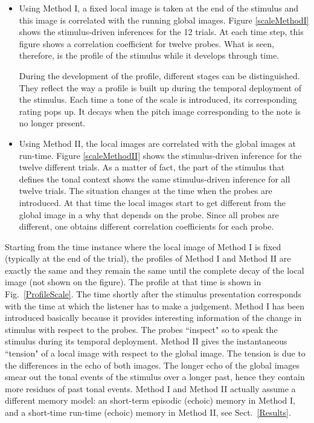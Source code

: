 \begin{itemize}
\item
    Using Method I, a fixed local image is taken at the end of the stimulus and this image
    is correlated with the running global images. Figure \ref{scaleMethodI} shows the
    stimulus-driven inferences for the 12 trials. At each time step, this figure shows a
    correlation coefficient for twelve probes. What is seen, therefore, is the profile of
    the stimulus while it develops through time.

    During the development of the profile, different stages can be distinguished. They
    reflect the way a profile is built up during the temporal deployment of the stimulus.
    Each time a tone of the scale is introduced, its corresponding rating pops up. It
    decays when the pitch image corresponding to the note is no longer present.

\item
    Using Method II, the local images are correlated with the global images at run-time.
    Figure \ref{scaleMethodII} shows the stimulus-driven inference for the twelve
    different trials. As a matter of fact, the part of the stimulus that defines the tonal
    context shows the same stimulus-driven inference for all twelve trials. The situation
    changes at the time when the probes are introduced. At that time the local images
    start to get different from the global image in a why that depends on the probe. Since
    all probes are different, one obtains different correlation coefficients for each
    probe.
\end{itemize}

Starting from the time instance where the local image of Method I is fixed (typically
at the end of the trial), the profiles of Method I and Method II are exactly the same
and they remain the same until the complete decay of the local image (not shown on the
figure). The profile at that time is shown in Fig.~\ref{ProfileScale}. The time
shortly after the stimulus presentation corresponds with the time at which the
listener has to make a judgement. Method I has been introduced basically because it
provides interesting information of the change in stimulus with respect to the probes.
The probes ``inspect" so to speak the stimulus during its temporal deployment. Method
II gives the instantaneous ``tension" of a local image with respect to the global
image. The tension is due to the differences in the echo of both images. The longer
echo of the global images smear out the tonal events of the stimulus over a longer
past, hence they contain more residues of past tonal events. Method I and Method II
actually assume a different memory model: an short-term episodic (echoic) memory in
Method I, and a short-time run-time (echoic) memory in Method II, see
Sect.~\ref{Results}.
